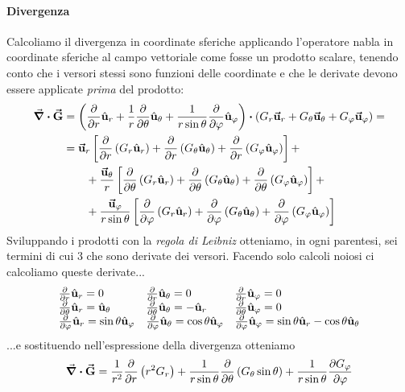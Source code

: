 \paragraph{Divergenza}\label{DivergenzaSferiche}
Calcoliamo il divergenza in coordinate sferiche applicando l'operatore nabla in coordinate sferiche al campo vettoriale come fosse un prodotto scalare, tenendo conto che i versori stessi sono funzioni delle coordinate e che le derivate devono essere applicate \textit{prima} del prodotto:
\begin{align*}
	\div{\vba{G}}&=\left(\pdv{r}\vbh{u}_r+\frac{1}{r}\pdv{\theta}\vbh{u}_\theta+\frac{1}{r\sin\theta}\pdv{\phi}\vbh{u}_\phi\right)\vdot\left(G_r\vba{u}_r+G_\theta\vba{u}_\theta+G_\phi\vba{u}_\phi\right)=\\
	&=\vba{u}_r\left[\pdv{r}\left(G_r\vbh{u}_r\right)+\pdv{r}\left(G_\theta\vbh{u}_\theta\right)+\pdv{r}\left(G_\phi\vbh{u}_{\phi}\right)\right]+\\
	&\qquad+\frac{\vba{u}_\theta}{r}\left[\pdv{\theta}\left(G_r\vbh{u}_r\right)+\pdv{\theta}\left(G_\theta\vbh{u}_\theta\right)+\pdv{\theta}\left(G_\phi\vbh{u}_{\phi}\right)\right]+\\
	&\qquad+\frac{\vba{u}_\phi}{r\sin\theta}\left[\pdv{\phi}\left(G_r\vbh{u}_r\right)+\pdv{\phi}\left(G_\theta\vbh{u}_\theta\right)+\pdv{\phi}\left(G_\phi\vbh{u}_{\phi}\right)\right]
\end{align*}
Sviluppando i prodotti con la \textit{regola di Leibniz} otteniamo, in ogni parentesi, sei termini di cui 3 che sono derivate dei versori. Facendo solo calcoli noiosi ci calcoliamo queste derivate...
\begin{equation*}
	\begin{array}{lll}
		\pdv{r}\hat{\mathbf{u}}_r=0&
		\pdv{r}\hat{\mathbf{u}}_\theta=0&
		\pdv{r}\hat{\mathbf{u}}_\varphi=0\\
		\pdv{\theta}\hat{\mathbf{u}}_r=\hat{\mathbf{u}}_\theta&
		\pdv{\theta}\hat{\mathbf{u}}_\theta=-\hat{\mathbf{u}}_r &
		\pdv{\theta}\hat{\mathbf{u}}_\varphi=0\\
		\pdv{\varphi}\hat{\mathbf{u}}_r=\sin\theta\hat{\mathbf{u}}_\varphi & \pdv{\varphi}\hat{\mathbf{u}}_\theta=\cos\theta\hat{\mathbf{u}}_\varphi & \pdv{\varphi}\hat{\mathbf{u}}_\varphi=\sin\theta\hat{\mathbf{u}}_r-\cos\theta\hat{\mathbf{u}}_\theta
	\end{array}
\end{equation*}
...e sostituendo nell'espressione della divergenza otteniamo
\begin{equation}
	\div{\vb*{\va{G}}}=\frac{1}{r^2}\pdv{r}\left(r^2G_r\right)+\frac{1}{r\sin\theta}\pdv{\theta}\left(G_\theta\sin\theta\right)+\frac{1}{r\sin\theta}\pdv{G_\varphi}{\varphi}
\end{equation}
